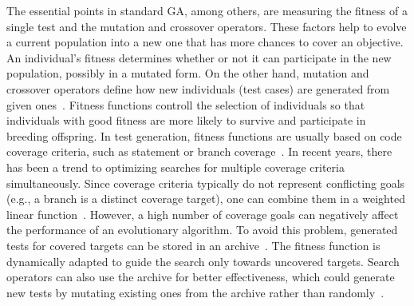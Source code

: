 \documentclass{article}
\begin{document}
The essential points in standard \ac{GA}, among others, are measuring the fitness of a single test and the mutation and crossover operators. These factors help to evolve a current population into a new one that has more chances to cover an objective. An individual's fitness determines whether or not it can participate in the new population, possibly in a mutated form. On the other hand, mutation and crossover operators define how new individuals (test cases) are generated from given ones~\cite{Tonella2004}. Fitness functions controll the selection of individuals so that individuals with good fitness are more likely to survive and participate in breeding offspring. In test generation, fitness functions are usually based on code coverage criteria, such as statement or branch coverage~\cite{Panichella2018}. In recent years, there has been a trend to optimizing searches for multiple coverage criteria simultaneously. Since coverage criteria typically do not represent conflicting goals (e.g., a branch is a distinct coverage target), one can combine them in a weighted linear function~\cite{Rojas2015}. However, a high number of coverage goals can negatively affect the performance of an evolutionary algorithm. To avoid this problem, generated tests for covered targets can be stored in an archive~\cite{Rojas2017}. The fitness function is dynamically adapted to guide the search only towards uncovered targets. Search operators can also use the archive for better effectiveness, which could generate new tests by mutating existing ones from the archive rather than randomly~\cite{Campos2017}. 
\end{document}
